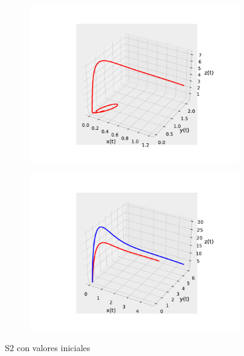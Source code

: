 \documentclass{wscpaperproc}
\theoremstyle{wsc}
\begin{document}
\begin{figure}[h]
	\centering
	\begin{subfigure}[b]{0.5\textwidth}
		\centering
		\includegraphics[width=\textwidth]{Simulations/S43d.pdf}
	
		\label{fig:comparativa91}
	\end{subfigure}%
	\begin{subfigure}[b]{0.5\textwidth}
		\centering
		\includegraphics[width=\textwidth]{Simulations/S13d.pdf}
		\label{fig:comparativa92}
	\end{subfigure}
	\caption{S2 con valores iniciales}

	\label{fig:comparacion12}
\end{figure}
\end{document}
